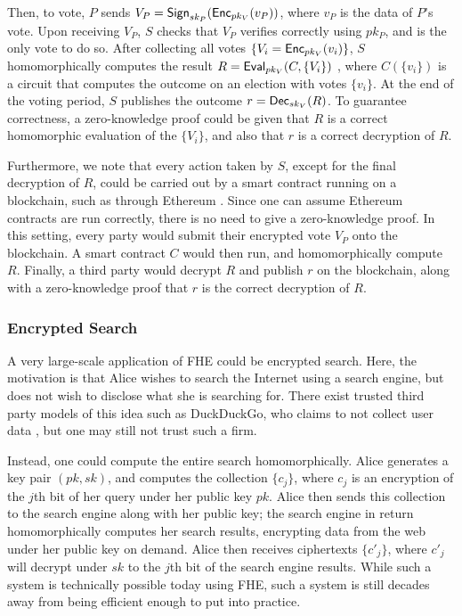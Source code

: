 Then, to vote, $P$ sends $V_P = {\sf Sign}_{sk_P}({\sf Enc}_{pk_V}(v_P))$, where $v_P$ is the data of $P$'s vote. Upon receiving $V_P$, $S$ checks that $V_P$ verifies correctly using $pk_P$, and is the only vote to do so. After collecting all votes $\{V_i = {\sf Enc}_{pk_V}(v_i)\}$, $S$ homomorphically computes the result $R = {\sf Eval}_{pk_V}(C, \{V_i\})$ , where $C(\{v_i\})$ is a circuit that computes the outcome on an election with votes $\{v_i\}$.
At the end of the voting period, $S$ publishes the outcome $r = {\sf Dec}_{sk_V}(R)$. To guarantee correctness, a zero-knowledge proof could be given that $R$ is a correct homomorphic evaluation of the $\{V_i\}$, and also that $r$ is a correct decryption of $R$.

Furthermore, we note that every action taken by $S$, except for the final decryption of $R$, could be carried out by a smart contract running on a blockchain, such as through Ethereum \cite{wood2014ethereum}. Since one can assume Ethereum contracts are run correctly, there is no need to give a zero-knowledge proof. In this setting, every party would submit their encrypted vote $V_P$ onto the blockchain. A smart contract $C$ would then run, and homomorphically compute $R$. Finally, a third party would decrypt $R$ and publish $r$ on the blockchain, along with a zero-knowledge proof that $r$ is the correct decryption of $R$.

\subsubsection{Encrypted Search}
A very large-scale application of FHE could be encrypted search. Here, the motivation is that Alice wishes to search the Internet using a search engine, but does not wish to disclose what she is searching for. There exist trusted third party models of this idea such as DuckDuckGo, who claims to not collect user data \cite{duckduckgo}, but one may still not trust such a firm.

Instead, one could compute the entire search homomorphically. Alice generates a key pair $(pk, sk)$, and computes the collection $\{c_j\}$, where $c_j$ is an encryption of the $j$th bit of her query under her public key $pk$. Alice then sends this collection to the search engine along with her public key; the search engine in return homomorphically computes her search results, encrypting data from the web under her public key on demand. Alice then receives ciphertexts $\{c'_j\}$, where $c'_j$ will decrypt under $sk$ to the $j$th bit of the search engine results. While such a system is technically possible today using FHE, such a system is still decades away from being efficient enough to put into practice.

